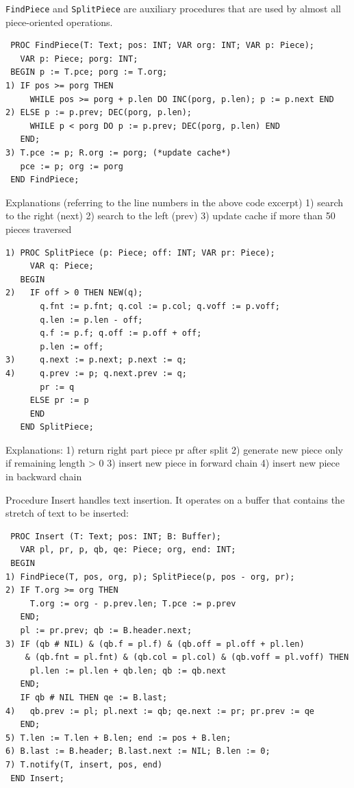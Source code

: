 \verb|FindPiece| and \verb|SplitPiece| are auxiliary procedures
that are used by almost all piece-oriented operations.
\begin{verbatim}
 PROC FindPiece(T: Text; pos: INT; VAR org: INT; VAR p: Piece);
   VAR p: Piece; porg: INT;
 BEGIN p := T.pce; porg := T.org;
1) IF pos >= porg THEN
     WHILE pos >= porg + p.len DO INC(porg, p.len); p := p.next END
2) ELSE p := p.prev; DEC(porg, p.len);
     WHILE p < porg DO p := p.prev; DEC(porg, p.len) END
   END;
3) T.pce := p; R.org := porg; (*update cache*)
   pce := p; org := porg
 END FindPiece;
\end{verbatim}

Explanations (referring to the line numbers in the above code excerpt)
1) search to the right (next)
2) search to the left (prev)
3) update cache if more than 50 pieces traversed

\begin{verbatim}
1) PROC SplitPiece (p: Piece; off: INT; VAR pr: Piece);
     VAR q: Piece;
   BEGIN
2)   IF off > 0 THEN NEW(q);
       q.fnt := p.fnt; q.col := p.col; q.voff := p.voff;
       q.len := p.len - off;
       q.f := p.f; q.off := p.off + off;
       p.len := off;
3)     q.next := p.next; p.next := q;
4)     q.prev := p; q.next.prev := q;
       pr := q
     ELSE pr := p
     END
   END SplitPiece;
\end{verbatim}

Explanations:
1) return right part piece pr after split
2) generate new piece only if remaining length > 0
3) insert new piece in forward chain
4) insert new piece in backward chain

Procedure Insert handles text insertion. It operates on a buffer that contains the stretch of text to be inserted:
\begin{verbatim}
 PROC Insert (T: Text; pos: INT; B: Buffer);
   VAR pl, pr, p, qb, qe: Piece; org, end: INT;
 BEGIN
1) FindPiece(T, pos, org, p); SplitPiece(p, pos - org, pr);
2) IF T.org >= org THEN
     T.org := org - p.prev.len; T.pce := p.prev
   END;
   pl := pr.prev; qb := B.header.next;
3) IF (qb # NIL) & (qb.f = pl.f) & (qb.off = pl.off + pl.len)
    & (qb.fnt = pl.fnt) & (qb.col = pl.col) & (qb.voff = pl.voff) THEN
     pl.len := pl.len + qb.len; qb := qb.next
   END;
   IF qb # NIL THEN qe := B.last;
4)   qb.prev := pl; pl.next := qb; qe.next := pr; pr.prev := qe
   END;
5) T.len := T.len + B.len; end := pos + B.len;
6) B.last := B.header; B.last.next := NIL; B.len := 0;
7) T.notify(T, insert, pos, end)
 END Insert;
\end{verbatim}

